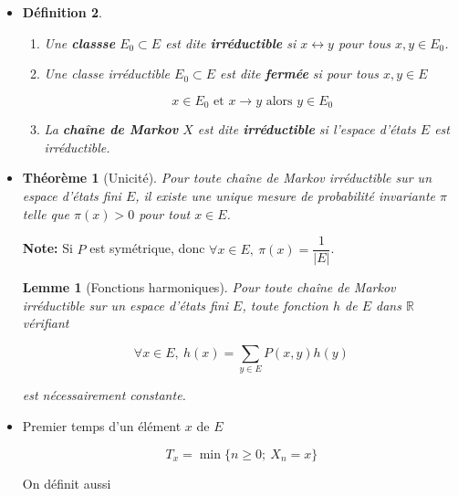 \documentclass[10pt,a4paper,oneside]{article}
\newtheorem{theoreme}{Théorème}
\newtheorem{lemme}{Lemme}
\newtheorem{definition}{Définition}
\begin{document}
\begin{itemize}
\begin{definition}
\begin{enumerate}
\[ \mathbb{P}_x(X_n = y) = \mathbb{P}(X_n = y | X_0 = x) > 0 \]

\item
\textbf{$x$ et $y$ communiquent}, on note $x \leftrightarrow y$, si $x$ communique avec $y$ et $y$ communique avec $x$.
\end{enumerate}
\end{definition}

\item
\begin{definition}
\begin{enumerate}
\item
Une \textbf{classse} $E_0 \subset E$ est dite \textbf{irréductible} si $x \leftrightarrow y$ pour tous $x,y \in E_0$.

\item
Une classe irréductible $E_0 \subset E$ est dite \textbf{fermée} si pour tous $x,y \in E$

\[ x \in E_0 \text{ et } x \to y \text{ alors } y \in E_0 \]

\item
La \textbf{chaîne de Markov} $X$ est dite \textbf{irréductible} si l'espace d'états $E$ est irréductible.
\end{enumerate}
\end{definition}

\item
\begin{theoreme}[Unicité]
Pour toute chaîne de Markov irréductible sur un espace d'états fini $E$, il existe une unique mesure de probabilité invariante $\pi$ telle que $\pi(x) > 0$ pour tout $x \in E$.
\end{theoreme}

\textbf{Note:} Si $P$ est symétrique, donc $\forall x \in E,\ \pi(x) = \dfrac{1}{|E|}$.

\begin{lemme}[Fonctions harmoniques]
Pour toute chaîne de Markov irréductible sur un espace d'états fini $E$, toute fonction $h$ de $E$ dans $\mathbb{R}$ vérifiant

\[ \forall x \in E,\ h(x) = \sum_{y \in E} P(x,y) h(y) \]

est nécessairement constante.
\end{lemme}

\item
Premier temps d'un élément $x$ de $E$

\[ T_x = \min \{ n \geq 0;\ X_n = x \} \]

On définit aussi


\end{itemize}
\end{document}
